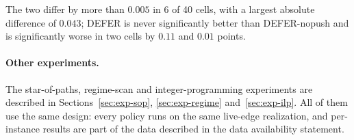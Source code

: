 \documentclass[11pt]{article}
\theoremstyle{definition}
\theoremstyle{remark}
\begin{document}
The two differ by more than $0.005$ in 6 of 40 cells, with a largest absolute difference of $0.043$; DEFER is never significantly better than DEFER-nopush and is significantly worse in two cells by $0.11$ and $0.01$ points.

\paragraph{Other experiments.} The star-of-paths, regime-scan and integer-programming experiments are described in Sections~\ref{sec:exp-sop}, \ref{sec:exp-regime} and~\ref{sec:exp-ilp}. All of them use the same design: every policy runs on the same live-edge realization, and per-instance results are part of the data described in the data availability statement.
\end{document}
